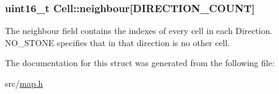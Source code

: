 \subsubsection[{\texorpdfstring{neighbour}{neighbour}}]{\setlength{\rightskip}{0pt plus 5cm}uint16\+\_\+t Cell\+::neighbour\mbox{[}{\bf D\+I\+R\+E\+C\+T\+I\+O\+N\+\_\+\+C\+O\+U\+NT}\mbox{]}}\hypertarget{struct_cell_a6d07727f0c63d9a3eea3c74ffe0ecfd6}{}\label{struct_cell_a6d07727f0c63d9a3eea3c74ffe0ecfd6}


The neighbour field contains the indexes of every cell in each Direction. N\+O\+\_\+\+S\+T\+O\+NE specifies that in that direction is no other cell. 



The documentation for this struct was generated from the following file\+:\begin{DoxyCompactItemize}
\item 
src/\hyperlink{map_8h}{map.\+h}\end{DoxyCompactItemize}
